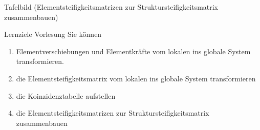 \documentclass[aspectratio=169,professionalfonts]{beamer}
\begin{document}
\begin{frame}{Tafelbild (Elementsteifigkeitsmatrizen zur
Struktursteifigkeitsmatrix zusammenbauen)}
  \centering
\end{frame}
\begin{frame}{Lernziele Vorlesung}
  \small
  Sie können
  \begin{enumerate}
    \item Elementverschiebungen und Elementkräfte vom lokalen ins globale System transformieren.
        \item die Elementsteifigkeitsmatrix vom lokalen
ins globale System transformieren
            \item die
Koinzidenztabelle aufstellen
\item die Elementsteifigkeitsmatrizen zur
Struktursteifigkeitsmatrix zusammenbauen 
  \end{enumerate}
\end{frame}
\end{document}
